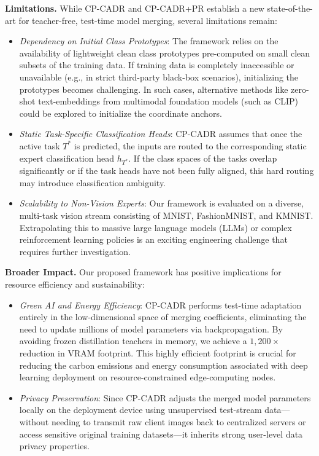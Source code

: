 \documentclass{article}
\theoremstyle{plain}
\theoremstyle{definition}
\theoremstyle{remark}
\begin{document}
\textbf{Limitations.} While CP-CADR and CP-CADR+PR establish a new state-of-the-art for teacher-free, test-time model merging, several limitations remain:
\begin{itemize}
    \item \emph{Dependency on Initial Class Prototypes}: The framework relies on the availability of lightweight clean class prototypes pre-computed on small clean subsets of the training data. If training data is completely inaccessible or unavailable (e.g., in strict third-party black-box scenarios), initializing the prototypes becomes challenging. In such cases, alternative methods like zero-shot text-embeddings from multimodal foundation models (such as CLIP) could be explored to initialize the coordinate anchors.
    \item \emph{Static Task-Specific Classification Heads}: CP-CADR assumes that once the active task $T^*$ is predicted, the inputs are routed to the corresponding static expert classification head $h_{T^*}$. If the class spaces of the tasks overlap significantly or if the task heads have not been fully aligned, this hard routing may introduce classification ambiguity.
    \item \emph{Scalability to Non-Vision Experts}: Our framework is evaluated on a diverse, multi-task vision stream consisting of MNIST, FashionMNIST, and KMNIST. Extrapolating this to massive large language models (LLMs) or complex reinforcement learning policies is an exciting engineering challenge that requires further investigation.
\end{itemize}

\textbf{Broader Impact.} Our proposed framework has positive implications for resource efficiency and sustainability:
\begin{itemize}
    \item \emph{Green AI and Energy Efficiency}: CP-CADR performs test-time adaptation entirely in the low-dimensional space of merging coefficients, eliminating the need to update millions of model parameters via backpropagation. By avoiding frozen distillation teachers in memory, we achieve a $1,200\times$ reduction in VRAM footprint. This highly efficient footprint is crucial for reducing the carbon emissions and energy consumption associated with deep learning deployment on resource-constrained edge-computing nodes.
    \item \emph{Privacy Preservation}: Since CP-CADR adjusts the merged model parameters locally on the deployment device using unsupervised test-stream data—without needing to transmit raw client images back to centralized servers or access sensitive original training datasets—it inherits strong user-level data privacy properties.
\end{itemize}
\end{document}
